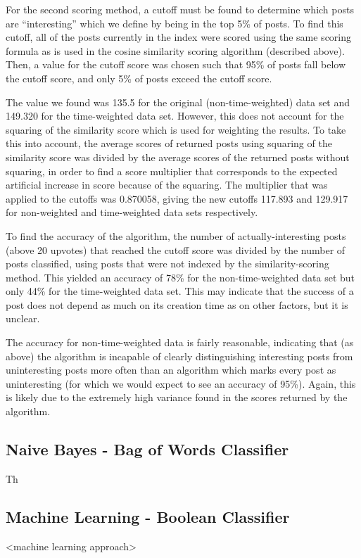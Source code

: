 \documentclass{acm_proc_article-sp}
\begin{document}
For the second scoring method, a cutoff must be found to determine which posts are ``interesting'' which we define by
being in the top 5\% of posts.  To find this cutoff, all of the posts currently in the index were scored using the
same scoring formula as is used in the cosine similarity scoring algorithm (described above).  Then, a value for
the cutoff score was chosen such that 95\% of posts fall below the cutoff score, and only 5\% of posts exceed the
cutoff score.

The value we found was 135.5 for the original (non-time-weighted) data set and 149.320 for the time-weighted data set.
However, this does not account for the squaring of the similarity score which is used for weighting the results.  To
take this into account, the average scores of returned posts using squaring of the similarity score was divided by the average
scores of the returned posts without squaring, in order to find a score multiplier that corresponds to the 
expected artificial increase in score because of the squaring.  The multiplier that was applied to the cutoffs
was 0.870058, giving the new cutoffs 117.893 and 129.917 for non-weighted and time-weighted data sets respectively.

To find the accuracy of the algorithm, the number of actually-interesting posts (above 20 upvotes) that reached
the cutoff score was divided by the number of posts classified, using posts that were not indexed by the
similarity-scoring method.  This yielded an accuracy of 78\% for the non-time-weighted data set but only 44\% for
the time-weighted data set.  This may indicate that the success of a post does not depend as much on its creation
time as on other factors, but it is unclear.

The accuracy for non-time-weighted data is fairly reasonable, indicating that (as above) the algorithm is incapable
of clearly distinguishing interesting posts from uninteresting posts more often than an algorithm which marks
every post as uninteresting (for which we would expect to see an accuracy of 95\%).
Again, this is likely due to the extremely high variance found in the scores returned by the
algorithm.

\subsection{Naive Bayes - Bag of Words Classifier}
Th

\subsection{Machine Learning - Boolean Classifier}
<machine learning approach>
\end{document}
